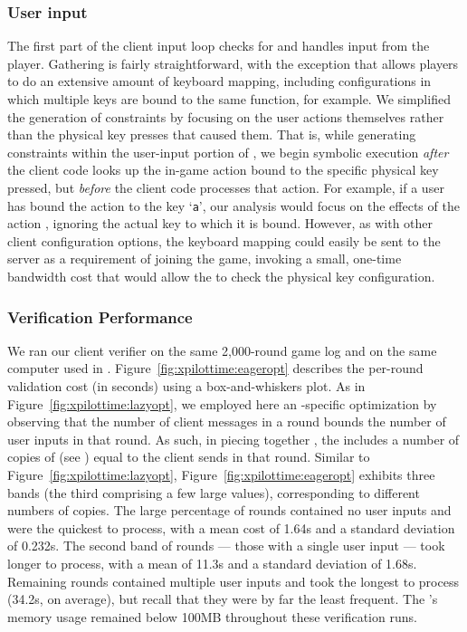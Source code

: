 \subsubsection{User input}
The first part of the client input loop checks for and handles input
from the player.  Gathering  is fairly straightforward, with
the exception that \xpilot allows players to do an extensive amount of
keyboard mapping, including configurations in which multiple keys are
bound to the same function, for example.  We simplified the generation
of constraints by focusing on the user actions themselves rather than
the physical key presses that caused them.  That is, while generating
constraints within the user-input portion of \xpilot, we begin
symbolic execution {\em after} the client code looks up the in-game
action bound to the specific physical key pressed, but {\em before}
the client code processes that action.  For example, if a user has
bound the action \keyfireshot to the key `{\tt a}', our analysis would focus
on the effects of the action \keyfireshot, ignoring the actual key to
which it is bound.  However, as with other client configuration
options, the keyboard mapping could easily be sent to the server as a
requirement of joining the game, invoking a small, one-time bandwidth
cost that would allow the \verifier to check the physical key
configuration.

\subsubsection{\Eager Verification Performance}
\label{sssec:xpilot:eager:eval}

We ran our \eager client verifier on the same 2,000-round \xpilot game
log and on the same computer used in .
Figure~\ref{fig:xpilottime:eageropt} describes the per-round
validation cost (in seconds) using a box-and-whiskers plot.  As in
Figure~\ref{fig:xpilottime:lazyopt}, we employed here an
\xpilot-specific optimization by observing that the number of client
messages in a round bounds the number of user inputs in that round.
As such, in piecing together \pathsegcons, the \verifier includes a
number of copies of  (see )
equal to the client sends in that round.  Similar to
Figure~\ref{fig:xpilottime:lazyopt},
Figure~\ref{fig:xpilottime:eageropt} exhibits three bands (the third
comprising a few large values), corresponding to different numbers of
copies.  The large percentage of rounds contained no user inputs and
were the quickest to process, with a mean cost of 1.64s and a standard
deviation of 0.232s.  The second band of rounds --- those with a
single user input --- took longer to process, with a mean of 11.3s and
a standard deviation of 1.68s.  Remaining rounds contained multiple
user inputs and took the longest to process (34.2s, on average), but
recall that they were by far the least frequent.  The \verifier's
memory usage remained below 100MB throughout these verification runs.

